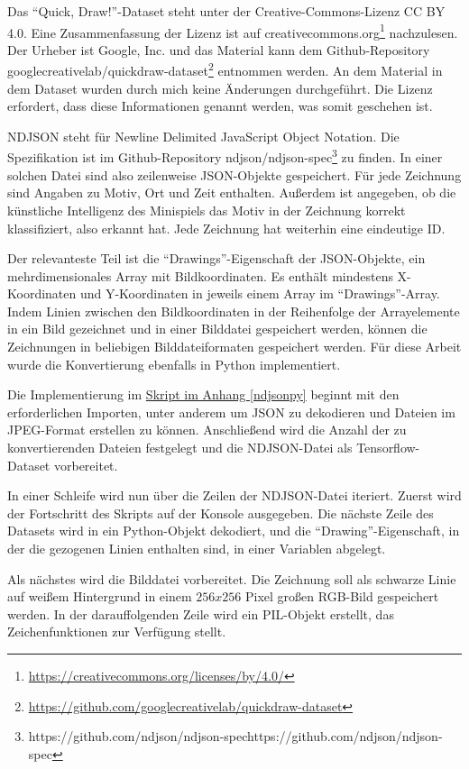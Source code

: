 Das ``Quick, Draw!''-Dataset steht unter der Creative-Commons-Lizenz CC BY 4.0. Eine Zusammenfassung der Lizenz ist auf creativecommons.org\footnote{\href{https://creativecommons.org/licenses/by/4.0/}{https://creativecommons.org/licenses/by/4.0/}} nachzulesen. Der Urheber ist Google, Inc. und das Material kann dem Github-Repository googlecreativelab/quickdraw-dataset\footnote{\href{https://github.com/googlecreativelab/quickdraw-dataset}{https://github.com/googlecreativelab/quickdraw-dataset}} entnommen werden. An dem Material in dem Dataset wurden durch mich keine Änderungen durchgeführt. Die Lizenz erfordert, dass diese Informationen genannt werden, was somit geschehen ist.

NDJSON steht für Newline Delimited JavaScript Object Notation. Die Spezifikation ist im Github-Repository ndjson/ndjson-spec\footnote{{https://github.com/ndjson/ndjson-spec}{https://github.com/ndjson/ndjson-spec}} zu finden. In einer solchen Datei sind also zeilenweise JSON-Objekte gespeichert. Für jede Zeichnung sind Angaben zu Motiv, Ort und Zeit enthalten. Außerdem ist angegeben, ob die künstliche Intelligenz des Minispiels das Motiv in der Zeichnung korrekt klassifiziert, also erkannt hat. Jede Zeichnung hat weiterhin eine eindeutige ID.

Der relevanteste Teil ist die ``Drawings''-Eigenschaft der JSON-Objekte, ein mehrdimensionales Array mit Bildkoordinaten. Es enthält mindestens X-Koordinaten und Y-Koordinaten in jeweils einem Array im ``Drawings''-Array. Indem Linien zwischen den Bildkoordinaten in der Reihenfolge der Arrayelemente in ein Bild gezeichnet und in einer Bilddatei gespeichert werden, können die Zeichnungen in beliebigen Bilddateiformaten gespeichert werden. Für diese Arbeit wurde die Konvertierung ebenfalls in Python implementiert.

Die Implementierung im \hyperref[ndjsonpy]{Skript im Anhang \ref{ndjsonpy}} beginnt mit den erforderlichen Importen, unter anderem um JSON zu dekodieren und Dateien im JPEG-Format erstellen zu können. Anschließend wird die Anzahl der zu konvertierenden Dateien festgelegt und die NDJSON-Datei als Tensorflow-Dataset vorbereitet.

In einer Schleife wird nun über die Zeilen der NDJSON-Datei iteriert. Zuerst wird der Fortschritt des Skripts auf der Konsole ausgegeben. Die nächste Zeile des Datasets wird in ein Python-Objekt dekodiert, und die ``Drawing''-Eigenschaft, in der die gezogenen Linien enthalten sind, in einer Variablen abgelegt.

Als nächstes wird die Bilddatei vorbereitet. Die Zeichnung soll als schwarze Linie auf weißem Hintergrund in einem $256x256$ Pixel großen RGB-Bild gespeichert werden. In der darauffolgenden Zeile wird ein PIL-Objekt erstellt, das Zeichenfunktionen zur Verfügung stellt.

